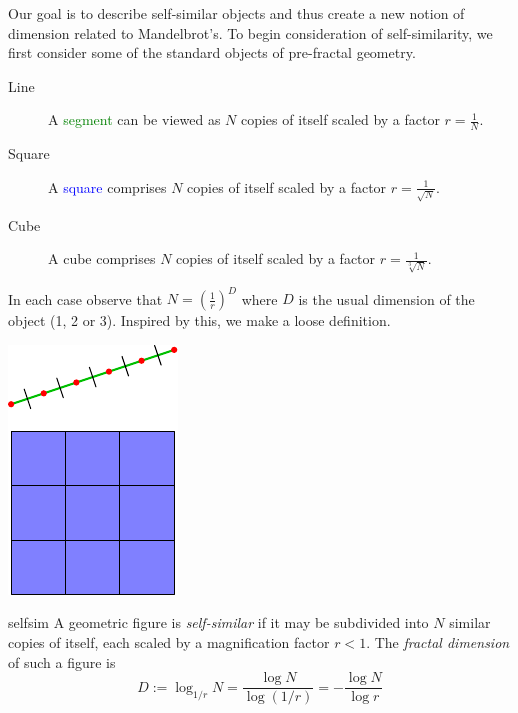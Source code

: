 Our goal is to describe self-similar objects and thus create a new notion of dimension related to Mandelbrot's. To begin consideration of self-similarity, we first consider some of the standard objects of pre-fractal geometry.\par
\begin{minipage}[t]{0.75\linewidth}\vspace{-5pt}
\begin{description}
	\item[Line] A \textcolor{Green}{segment} can be viewed as $N$ copies of itself scaled by a factor $r=\frac 1N$.
	\item[Square] A \textcolor{blue}{square} comprises $N$ copies of itself scaled by a factor $r=\frac 1{\sqrt N}$.
	\item[Cube] A cube comprises $N$ copies of itself scaled by a factor $r=\frac 1{\sqrt[3]{N}}$.
\end{description}\vspace{-5pt}
In each case observe that $N=\left(\frac 1r\right)^D$ where $D$ is the usual dimension of the object (1, 2 or 3). Inspired by this, we make a loose definition.
\end{minipage}\hfill\begin{minipage}[t]{0.24\linewidth}\vspace{-15pt}
\flushright\includegraphics[scale=0.95]{self-sim-line}
\end{minipage}


\begin{defn}{}{selfsim}
A geometric figure is \emph{self-similar} if it may be subdivided into $N$ similar copies of itself, each scaled by a magnification factor $r<1$. The \emph{fractal dimension} of such a figure is
\[\displaystyle D:=\log_{1/r}N=\frac{\log N}{\log (1/r)}=-\frac{\log N}{\log r}\]
\end{defn}


